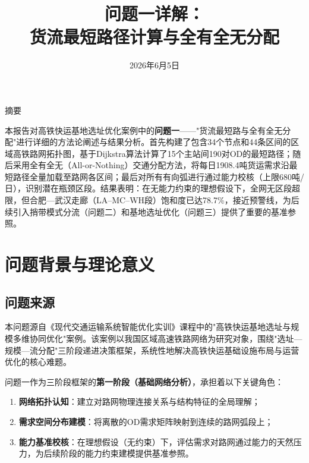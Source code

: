 \documentclass[12pt,a4paper,fontset=none]{ctexart}
\begin{document}
\title{\heiti{} 问题一详解：\\[6pt]
       货流最短路径计算与全有全无分配}
\author{}
\date{ 2026年6月5日}
\maketitle
\thispagestyle{empty}

\vspace{12pt}
\begin{center}
\large\heiti 摘要
\end{center}
\vspace{6pt}

\noindent 本报告对高铁快运基地选址优化案例中的\textbf{问题一}——"货流最短路与全有全无分配"进行详细的方法论阐述与结果分析。首先构建了包含34个节点和44条区间的区域高铁路网拓扑图，基于Dijkstra算法计算了15个主站间190对OD的最短路径；随后采用全有全无（All-or-Nothing）交通分配方法，将每日1908.4吨货运需求沿最短路径全量加载至路网各区间；最后对所有有向弧进行通过能力校核（上限680吨/日），识别潜在瓶颈区段。结果表明：在无能力约束的理想假设下，全网无区段超限，但合肥—武汉走廊（LA--MC--WH段）饱和度已达78.7\%，接近预警线，为后续引入捎带模式分流（问题二）和基地选址优化（问题三）提供了重要的基准参照。

\newpage
\tableofcontents
\newpage

\section{问题背景与理论意义}

\subsection{问题来源}

本问题源自《现代交通运输系统智能优化实训》课程中的"高铁快运基地选址与规模多维协同优化"案例。该案例以我国区域高速铁路网络为研究对象，围绕"选址—规模—流分配"三阶段递进决策框架，系统性地解决高铁快运基础设施布局与运营优化的核心难题。

问题一作为三阶段框架的\textbf{第一阶段（基础网络分析）}，承担着以下关键角色：

\begin{enumerate}[leftmargin=*]
    \item \textbf{网络拓扑认知}：建立对路网物理连接关系与结构特征的全局理解；
    \item \textbf{需求空间分布建模}：将离散的OD需求矩阵映射到连续的路网弧段上；
    \item \textbf{能力基准校核}：在理想假设（无约束）下，评估需求对路网通过能力的天然压力，为后续阶段的能力约束建模提供基准参照。
\end{enumerate}
\end{document}
